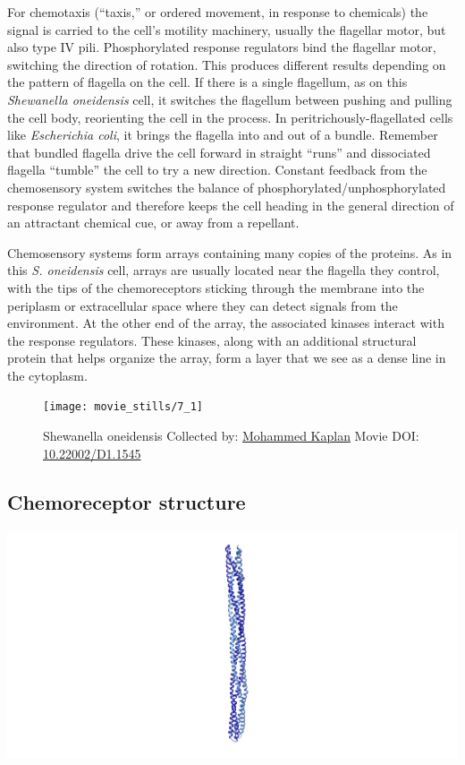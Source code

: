 \documentclass[]{tufte-book}
\begin{document}
For chemotaxis (``taxis,'' or ordered movement, in response to
chemicals) the signal is carried to the cell's motility machinery,
usually the flagellar motor, but also type IV pili. Phosphorylated
response regulators bind the flagellar motor, switching the direction of
rotation. This produces different results depending on the pattern of
flagella on the cell. If there is a single flagellum, as on this
\emph{Shewanella oneidensis} cell, it switches the flagellum between
pushing and pulling the cell body, reorienting the cell in the process.
In peritrichously-flagellated cells like \emph{Escherichia coli}, it
brings the flagella into and out of a bundle. Remember that bundled
flagella drive the cell forward in straight ``runs'' and dissociated
flagella ``tumble'' the cell to try a new direction. Constant feedback
from the chemosensory system switches the balance of
phosphorylated/unphosphorylated response regulator and therefore keeps
the cell heading in the general direction of an attractant chemical cue,
or away from a repellant.

Chemosensory systems form arrays containing many copies of the proteins.
As in this \emph{S. oneidensis} cell, arrays are usually located near
the flagella they control, with the tips of the chemoreceptors sticking
through the membrane into the periplasm or extracellular space where
they can detect signals from the environment. At the other end of the
array, the associated kinases interact with the response regulators.
These kinases, along with an additional structural protein that helps
organize the array, form a layer that we see as a dense line in the
cytoplasm.





\begin{figure}
\texttt{[image: movie\_stills/7\_1]} \caption[Shewanella oneidensis Collected by:
\protect\hyperlink{mohammed_kaplan}{Mohammed Kaplan} Movie DOI:
\href{https://doi.org/10.22002/D1.1545}{10.22002/D1.1545}]{Shewanella oneidensis Collected by:
\protect\hyperlink{mohammed_kaplan}{Mohammed Kaplan} Movie DOI:
\href{https://doi.org/10.22002/D1.1545}{10.22002/D1.1545}}\label{fig:7-1}
\end{figure}

\subsection{Chemoreceptor structure}\label{Chemoreceptor_structure}

\includegraphics{img/schematics/7_1_1}
\end{document}
